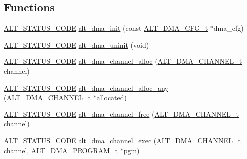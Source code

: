 \subsection*{Functions}
\begin{DoxyCompactItemize}
\item 
\mbox{\hyperlink{hwlib_8h_abdb0d369f069723ca55d6c94bcaaaa12}{A\+L\+T\+\_\+\+S\+T\+A\+T\+U\+S\+\_\+\+C\+O\+DE}} \mbox{\hyperlink{group__ALT__DMA__CSR_gae8048badd0d8eb37f5ae66de7b302c57}{alt\+\_\+dma\+\_\+init}} (const \mbox{\hyperlink{group__ALT__DMA__CSR_ga45eeb28a3a41b762727db85583888f34}{A\+L\+T\+\_\+\+D\+M\+A\+\_\+\+C\+F\+G\+\_\+t}} $\ast$dma\+\_\+cfg)
\item 
\mbox{\hyperlink{hwlib_8h_abdb0d369f069723ca55d6c94bcaaaa12}{A\+L\+T\+\_\+\+S\+T\+A\+T\+U\+S\+\_\+\+C\+O\+DE}} \mbox{\hyperlink{group__ALT__DMA__CSR_ga66019f52be3fa8755756b24f49283f12}{alt\+\_\+dma\+\_\+uninit}} (void)
\item 
\mbox{\hyperlink{hwlib_8h_abdb0d369f069723ca55d6c94bcaaaa12}{A\+L\+T\+\_\+\+S\+T\+A\+T\+U\+S\+\_\+\+C\+O\+DE}} \mbox{\hyperlink{group__ALT__DMA__CSR_ga49e40e18369c2940a8ff8709ccb0a346}{alt\+\_\+dma\+\_\+channel\+\_\+alloc}} (\mbox{\hyperlink{group__ALT__DMA__COMMON_ga959232e3b00ce45a3049183cce4c9d59}{A\+L\+T\+\_\+\+D\+M\+A\+\_\+\+C\+H\+A\+N\+N\+E\+L\+\_\+t}} channel)
\item 
\mbox{\hyperlink{hwlib_8h_abdb0d369f069723ca55d6c94bcaaaa12}{A\+L\+T\+\_\+\+S\+T\+A\+T\+U\+S\+\_\+\+C\+O\+DE}} \mbox{\hyperlink{group__ALT__DMA__CSR_ga8d3cefc8aa4d1bf07af0b64092f30015}{alt\+\_\+dma\+\_\+channel\+\_\+alloc\+\_\+any}} (\mbox{\hyperlink{group__ALT__DMA__COMMON_ga959232e3b00ce45a3049183cce4c9d59}{A\+L\+T\+\_\+\+D\+M\+A\+\_\+\+C\+H\+A\+N\+N\+E\+L\+\_\+t}} $\ast$allocated)
\item 
\mbox{\hyperlink{hwlib_8h_abdb0d369f069723ca55d6c94bcaaaa12}{A\+L\+T\+\_\+\+S\+T\+A\+T\+U\+S\+\_\+\+C\+O\+DE}} \mbox{\hyperlink{group__ALT__DMA__CSR_gade3cca6069a5ec1306d3116abeacc5de}{alt\+\_\+dma\+\_\+channel\+\_\+free}} (\mbox{\hyperlink{group__ALT__DMA__COMMON_ga959232e3b00ce45a3049183cce4c9d59}{A\+L\+T\+\_\+\+D\+M\+A\+\_\+\+C\+H\+A\+N\+N\+E\+L\+\_\+t}} channel)
\item 
\mbox{\hyperlink{hwlib_8h_abdb0d369f069723ca55d6c94bcaaaa12}{A\+L\+T\+\_\+\+S\+T\+A\+T\+U\+S\+\_\+\+C\+O\+DE}} \mbox{\hyperlink{group__ALT__DMA__CSR_gac948d0a8fa737070efc6b0d2d6570420}{alt\+\_\+dma\+\_\+channel\+\_\+exec}} (\mbox{\hyperlink{group__ALT__DMA__COMMON_ga959232e3b00ce45a3049183cce4c9d59}{A\+L\+T\+\_\+\+D\+M\+A\+\_\+\+C\+H\+A\+N\+N\+E\+L\+\_\+t}} channel, \mbox{\hyperlink{group__ALT__DMA__PRG_gadb7028531574894854db4db6d797de97}{A\+L\+T\+\_\+\+D\+M\+A\+\_\+\+P\+R\+O\+G\+R\+A\+M\+\_\+t}} $\ast$pgm)

\end{DoxyCompactItemize}
